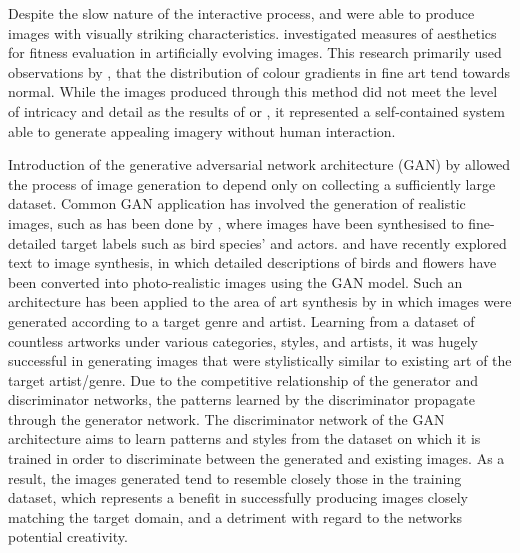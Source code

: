 \documentclass{article}
\begin{document}
Despite the slow nature of the interactive process, \citet{sims} and \citet{nevar} were able to produce images with visually striking characteristics.
\citet{aesthetic-measures} investigated measures of aesthetics for fitness evaluation in artificially evolving images.
This research primarily used observations by \citet{ralph-bell-curve}, that the distribution of colour gradients in fine art tend towards normal.
While the images produced through this method did not meet the level of intricacy and detail as the results of \citet{sims} or \citet{nevar}, it represented a self-contained system able to generate appealing imagery without human interaction.

Introduction of the generative adversarial network architecture (GAN) by \citet{GAN} allowed the process of image generation to depend only on collecting a sufficiently large dataset.
Common GAN application has involved the generation of realistic images, such as has been done by \citet{bao2017cvae}, where images have been synthesised to fine-detailed target labels such as bird species' and actors.
\citet{zhang2017stackgan} and \citet{reed2016generative} have recently explored text to image synthesis, in which detailed descriptions of birds and flowers have been converted into photo-realistic images using the GAN model.
Such an architecture has been applied to the area of art synthesis by \citet{tan2017artgan} in which images were generated according to a target genre and artist.
Learning from a dataset of countless artworks under various categories, styles, and artists, it was hugely successful in generating images that were stylistically similar to existing art of the target artist/genre.
Due to the competitive relationship of the generator and discriminator networks, the patterns learned by the discriminator propagate through the generator network.
The discriminator network of the GAN architecture aims to learn patterns and styles from the dataset on which it is trained in order to discriminate between the generated and existing images.
As a result, the images generated tend to resemble closely those in the training dataset, which represents a benefit in successfully producing images closely matching the target domain, and a detriment with regard to the networks potential creativity.
\end{document}
